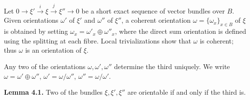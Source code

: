 Let $0 \to \xi' \xrightarrow{i} \xi \xrightarrow{j} \xi'' \to 0$ be a short exact sequence of vector bundles over $B$. Given orientations $\omega'$ of $\xi'$ and $\omega''$ of $\xi''$, a coherent orientation $\omega = \{\omega_x\}_{x \in B}$ of $\xi$ is obtained by setting $\omega_x = \omega'_x \oplus \omega''_x$, where the direct sum orientation is defined using the splitting at each fibre. Local trivializations show that $\omega$ is coherent; thus $\omega$ is an orientation of $\xi$.

Any two of the orientations $\omega, \omega', \omega''$ determine the third uniquely. We write $\omega = \omega' \oplus \omega''$, $\omega' = \omega/\omega''$, $\omega'' = \omega/\omega'$.

\textbf{Lemma 4.1.} Two of the bundles $\xi, \xi', \xi''$ are orientable if and only if the third is.

